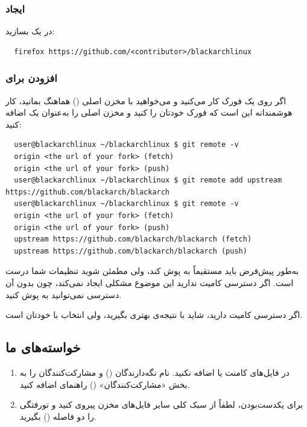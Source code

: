 \documentclass[a4paper, oneside, 11pt]{book}
\begin{document}
\subsubsection{ایجاد }
در \href{https://github.com/}{} یک  بسازید:
\begin{latin}
\begin{lstlisting}
  firefox https://github.com/<contributor>/blackarchlinux
\end{lstlisting}
\end{latin}

\subsubsection{افزودن  برای }
اگر روی یک فورک کار می‌کنید و می‌خواهید با مخزن اصلی () هماهنگ بمانید،
کار هوشمندانه این است که فورک خودتان را  کنید و مخزن اصلی  را
به‌عنوان یک  اضافه کنید:
\begin{latin}
\begin{lstlisting}
  user@blackarchlinux ~/blackarchlinux $ git remote -v
  origin <the url of your fork> (fetch)
  origin <the url of your fork> (push)
  user@blackarchlinux ~/blackarchlinux $ git remote add upstream https://github.com/blackarch/blackarch
  user@blackarchlinux ~/blackarchlinux $ git remote -v
  origin <the url of your fork> (fetch)
  origin <the url of your fork> (push)
  upstream https://github.com/blackarch/blackarch (fetch)
  upstream https://github.com/blackarch/blackarch (push)
\end{lstlisting}
\end{latin}

به‌طور پیش‌فرض  باید مستقیماً به  پوش کند، ولی مطمئن شوید تنظیمات 
شما درست است. اگر دسترسی کامیت ندارید این موضوع مشکلی ایجاد نمی‌کند، چون بدون
آن دسترسی نمی‌توانید به  پوش کنید.

اگر دسترسی کامیت دارید، شاید با
 نتیجه‌ی بهتری بگیرید،
ولی انتخاب با خودتان است.

\subsection{خواسته‌های ما}
\begin{enumerate}
\item در فایل‌های \textit{} کامنت \textbf{} یا
\textbf{} اضافه نکنید. نام نگه‌دارندگان () و
مشارکت‌کنندگان را به بخش «مشارکت‌کنندگان» () راهنمای  اضافه
کنید.
\item برای یکدست‌بودن، لطفاً از سبک کلی سایر فایل‌های \textit{} مخزن
پیروی کنید و تورفتگی را دو فاصله () بگیرید.
\end{enumerate}
\end{document}
